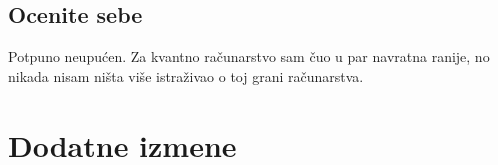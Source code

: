 \documentclass[a4paper]{report}
\begin{document}
\section{Ocenite sebe}
Potpuno neupućen. Za kvantno računarstvo sam čuo u par navratna ranije, no nikada nisam ništa više istraživao o toj grani računarstva.


\chapter{Dodatne izmene}
\end{document}
